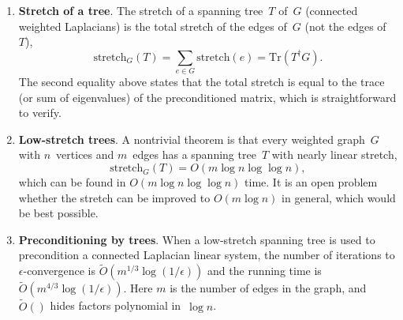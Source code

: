 \documentclass[11pt]{article}
\newcommand{\stretchh}{\mbox{stretch}}
\newcommand{\pinv}{^{\dagger}}          %
\newcommand{\Tr}{\mbox{Tr}}             %
\begin{document}
\begin{enumerate}
\item{\bf Stretch of a tree}.
The stretch of a spanning tree~$T$ of~$G$ 
(connected weighted Laplacians)
is the total stretch of the edges of~$G$ (not the edges of~$T$),
$$\stretchh_G(T)=\sum_{e\in G}\stretchh(e)=\Tr(T\pinv G).$$
The second equality above states that the total stretch is equal to 
the trace (or sum of eigenvalues) of the preconditioned matrix,
which is straightforward to verify.

\item{\bf Low-stretch trees}.
A nontrivial theorem is that every weighted graph~$G$ 
with $n$~vertices and $m$~edges
has a spanning tree~$T$ with nearly linear stretch,
$$\stretchh_G(T)=O(m\log n\log\log n),$$
which can be found in $O(m\log n\log\log n)$ time.
It is an open problem whether the stretch can be improved
to $O(m\log n)$ in general, which would be best possible.

\item{\bf Preconditioning by trees}.
When a low-stretch spanning tree is used to precondition 
a connected Laplacian linear system, the number of iterations to
$\epsilon$-convergence is $\tilde{O}(m^{1/3}\log(1/\epsilon))$ and the running
time is $\tilde{O}(m^{4/3}\log(1/\epsilon))$.
Here $m$ is the number of edges in the graph, 
and $\tilde{O}()$ hides factors polynomial in~$\log n$.



\end{enumerate}
\end{document}
